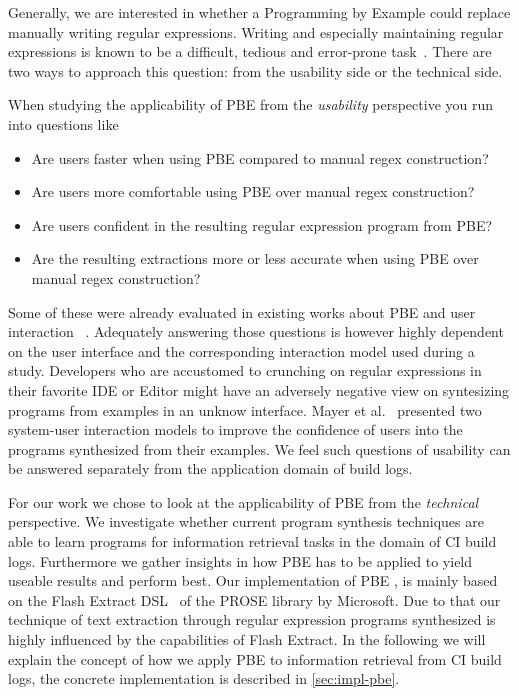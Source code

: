 \documentclass[\myrootdir/main.tex]{subfiles}
\begin{document}
Generally, we are interested in whether a Programming by Example could replace manually writing regular expressions.
Writing and especially maintaining regular expressions is known to be a difficult, tedious and error-prone task~\cite{michael2019regexes}.
There are two ways to approach this question: from the usability side or the technical side.

When studying the applicability of PBE from the \emph{usability} perspective you run into questions like
\begin{itemize}
	\item Are users faster when using PBE compared to manual regex construction?
	\item Are users more comfortable using PBE over manual regex construction?
	\item Are users confident in the resulting regular expression program from PBE?
	\item Are the resulting extractions more or less accurate when using PBE over manual regex construction?
\end{itemize}
Some of these were already evaluated in existing works about PBE and user interaction~\cite{mayer2015user} .
Adequately answering those questions is however highly dependent on the user interface and the corresponding interaction model used during a study.
Developers who are accustomed to crunching on regular expressions in their favorite IDE or Editor might have an adversely negative view on syntesizing programs from examples in an unknow interface.
Mayer et al.~\cite{mayer2015user} presented two system-user interaction models to improve the confidence of users into the programs synthesized from their examples.
We feel such questions of usability can be answered separately from the application domain of build logs.

For our work we chose to look at the applicability of PBE from the \emph{technical} perspective.
We investigate whether current program synthesis techniques are able to learn programs for information retrieval tasks in the domain of CI build logs.
Furthermore we gather insights in how PBE has to be applied to yield useable results and perform best.
Our implementation of PBE , is mainly based on the Flash Extract DSL~\cite{flahsextractpaper} of the PROSE library by Microsoft.
Due to that our technique of text extraction through regular expression programs synthesized is highly influenced by the capabilities of Flash Extract.
In the following we will explain the concept of how we apply PBE to information retrieval from CI build logs, the concrete implementation is described in \ref{sec:impl-pbe}.
\end{document}
